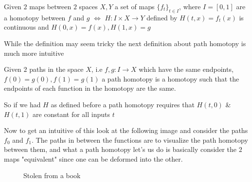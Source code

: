 \documentclass[paper=a4,fontsize=paper,12.5pt]{book}
\newcommand{\3}{\vspace*{3mm}}
\newcommand{\IFF}{$\Longleftrightarrow$ \hspace*{.5mm}}
\begin{document}
\3

\begin{definition}

Given $2$ maps between $2$ spaces $X,Y$ a set of maps $\{{f}_{t}\}_{t \in I}$, where $I = [0,1]$ are a homotopy between $f$ and $g$ \IFF $H: I \times X \to Y$ defined by $H(t,x) = {f}_{t}(x)$ is continuous and $H(0,x) = f(x),H(1,x) = g$



\end{definition}

\3

While the definition may seem tricky the next definition about path homotopy is much more intuitive

\3

\begin{definition}

Given $2$ paths in the space $X$, i.e $f,g: I \to X$ which have the same endpoints, $f(0) = g(0), f(1) = g(1)$ a path homotopy is a homotopy such that the endpoints of each function in the homotopy are the same. 

\3

So if we had $H$ as defined before a path homotopy requires that $H(t,0)$ \&\ $H(t,1)$ are constant for all inputs $t$


\end{definition}

\3

Now to get an intuitive of this look at the following image and consider the paths ${f}_{0}$ and ${f}_{1}$. The paths in between the functions are to visualize the path homotopy between them, and what a path homotopy let's us do is basically consider the $2$ maps "equivalent" since one can be deformed into the other.

\3

{
 \begin{figure}[!hbt]
 \begin{center}
 \begin{minipage}{0.85\textwidth}
 \caption{\label{1}\small{Stolen from a book}}
 \end{minipage}
 \end{center}
 \end{figure}
 }
\end{document}
